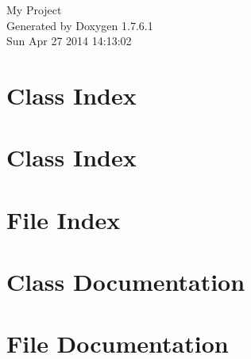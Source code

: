 \documentclass[a4paper]{book}
\begin{document}
\hypersetup{pageanchor=false,citecolor=blue}
\begin{titlepage}
\vspace*{7cm}
\begin{center}
{\Large \-My \-Project }\\
\vspace*{1cm}
{\large \-Generated by Doxygen 1.7.6.1}\\
\vspace*{0.5cm}
{\small Sun Apr 27 2014 14:13:02}\\
\end{center}
\end{titlepage}
\clearemptydoublepage
{}
\tableofcontents
\clearemptydoublepage
{}
\hypersetup{pageanchor=true,citecolor=blue}
\chapter{\-Class \-Index}

\chapter{\-Class \-Index}

\chapter{\-File \-Index}

\chapter{\-Class \-Documentation}

































\chapter{\-File \-Documentation}
















\printindex
\end{document}
